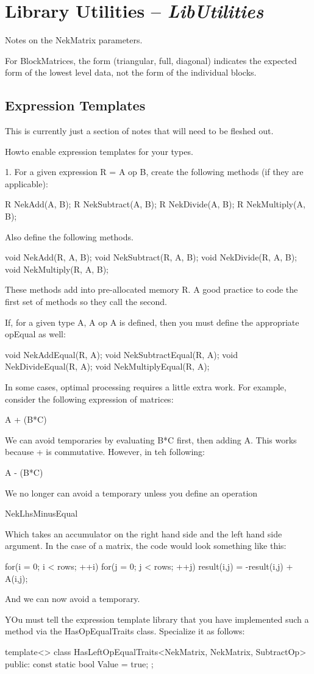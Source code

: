 
\chapter{Library Utilities -- {\em LibUtilities}}

Notes on the NekMatrix parameters.

For BlockMatrices, the form (triangular, full, diagonal) indicates the expected form of the lowest 
level data, not the form of the individual blocks.


\section{Expression Templates}

This is currently just a section of notes that will need
to be fleshed out.


Howto enable expression templates for your types.

1.  For a given expression R = A op B, create the following methods
(if they are applicable):

R NekAdd(A, B);
R NekSubtract(A, B);
R NekDivide(A, B);
R NekMultiply(A, B);

Also define the following methods.  

void NekAdd(R, A, B);
void NekSubtract(R, A, B);
void NekDivide(R, A, B);
void NekMultiply(R, A, B);

These methods add into pre-allocated memory R.  
A good practice to code the first set of methods so they call 
the second.


If, for a given type A, A op A is defined, then you must define 
the appropriate opEqual as well:

void NekAddEqual(R, A);
void NekSubtractEqual(R, A);
void NekDivideEqual(R, A);
void NekMultiplyEqual(R, A);


In some cases, optimal processing requires a little extra work.  For example, consider the following expression of matrices:

A + (B*C)

We can avoid temporaries by evaluating B*C first, then adding A.  This works because + is commutative.  However, in teh following:

A - (B*C)

We no longer can avoid a temporary unless you define an operation 

NekLhsMinusEqual

Which takes an accumulator on the right hand side and the left hand side argument.  In the case of a matrix, the code would look something like this:

for(i = 0; i < rows; ++i)
{
  for(j = 0; j < rows; ++j)
  {
    result(i,j) = -result(i,j) + A(i,j);
  }
}

And we can now avoid a temporary.

YOu must tell the expression template library that you have implemented such a method via the HasOpEqualTraits class.  Specialize it as follows:

template<>
class HasLeftOpEqualTraits<NekMatrix, NekMatrix, SubtractOp>
{
   public:
      const static bool Value = true;
};